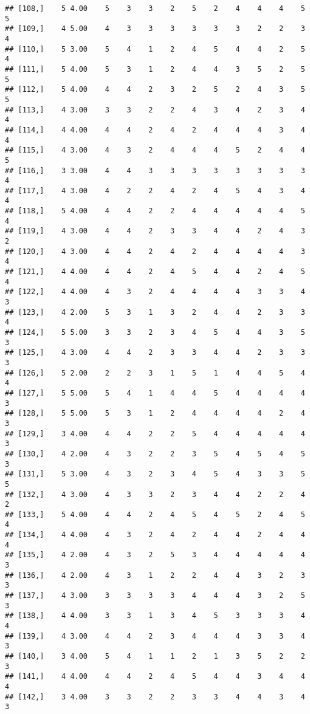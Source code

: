 \documentclass[]{article}
\begin{document}
\begin{verbatim}
## [108,]    5 4.00    5    3    3    2    5    2    4    4    4    5    5
## [109,]    4 5.00    4    3    3    3    3    3    3    2    2    3    4
## [110,]    5 3.00    5    4    1    2    4    5    4    4    2    5    4
## [111,]    5 4.00    5    3    1    2    4    4    3    5    2    5    5
## [112,]    5 4.00    4    4    2    3    2    5    2    4    3    5    5
## [113,]    4 3.00    3    3    2    2    4    3    4    2    3    4    4
## [114,]    4 4.00    4    4    2    4    2    4    4    4    3    4    4
## [115,]    4 3.00    4    3    2    4    4    4    5    2    4    4    5
## [116,]    3 3.00    4    4    3    3    3    3    3    3    3    3    4
## [117,]    4 3.00    4    2    2    4    2    4    5    4    3    4    4
## [118,]    5 4.00    4    4    2    2    4    4    4    4    4    5    4
## [119,]    4 3.00    4    4    2    3    3    4    4    2    4    3    2
## [120,]    4 3.00    4    4    2    4    2    4    4    4    4    3    4
## [121,]    4 4.00    4    4    2    4    5    4    4    2    4    5    4
## [122,]    4 4.00    4    3    2    4    4    4    4    3    3    4    3
## [123,]    4 2.00    5    3    1    3    2    4    4    2    3    3    4
## [124,]    5 5.00    3    3    2    3    4    5    4    4    3    5    3
## [125,]    4 3.00    4    4    2    3    3    4    4    2    3    3    3
## [126,]    5 2.00    2    2    3    1    5    1    4    4    5    4    4
## [127,]    5 5.00    5    4    1    4    4    5    4    4    4    4    3
## [128,]    5 5.00    5    3    1    2    4    4    4    4    2    4    3
## [129,]    3 4.00    4    4    2    2    5    4    4    4    4    4    3
## [130,]    4 2.00    4    3    2    2    3    5    4    5    4    5    3
## [131,]    5 3.00    4    3    2    3    4    5    4    3    3    5    5
## [132,]    4 3.00    4    3    3    2    3    4    4    2    2    4    2
## [133,]    5 4.00    4    4    2    4    5    4    5    2    4    5    4
## [134,]    4 4.00    4    3    2    4    2    4    4    2    4    4    4
## [135,]    4 2.00    4    3    2    5    3    4    4    4    4    4    3
## [136,]    4 2.00    4    3    1    2    2    4    4    3    2    3    3
## [137,]    4 3.00    3    3    3    3    4    4    4    3    2    5    3
## [138,]    4 4.00    3    3    1    3    4    5    3    3    3    4    4
## [139,]    4 3.00    4    4    2    3    4    4    4    3    3    4    3
## [140,]    3 4.00    5    4    1    1    2    1    3    5    2    2    3
## [141,]    4 4.00    4    4    2    4    5    4    4    3    4    4    4
## [142,]    3 4.00    3    3    2    2    3    3    4    4    3    4    3

\end{verbatim}
\end{document}
